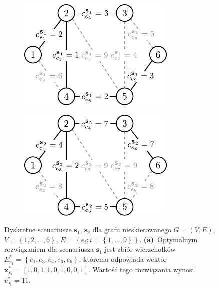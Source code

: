 \begin{figure}[!htbp]
	\null\hfill
	\begin{subfigure}[b]{0.35\textwidth}
		\includegraphics[width=\textwidth]{Chapter_II/MIN-MAX-REG-example/a}
		\caption{}
		\label{fig:minmaxregexample:a}
	\end{subfigure}
	\hfill
	\begin{subfigure}[b]{0.35\textwidth}
		\includegraphics[width=\textwidth]{Chapter_II/MIN-MAX-REG-example/b}
		\caption{}
		\label{fig:minmaxregexample:b}
	\end{subfigure}
	\hfill\null
	\caption{
		Dyskretne scenariusze $\textbf{s}_{1}$, $\textbf{s}_{2}$ dla grafu nieskierowanego $G = \left( V, E \right)$, $V = \left\{ 1, 2, \dots, 6 \right\}$, $E = \left\{ e_{i} : i = \left\{ 1, \dots, 9 \right\} \right\}$.
		\textbf{(a)}~Optymalnym rozwiązaniem dla scenariusza $\textbf{s}_{1}$ jest zbiór wierzchołków $E^{\ast}_{\textbf{s}_{1}} = \left\{ e_{1}, e_{3}, e_{4}, e_{6}, e_{9} \right\}$, któremu odpowiada wektor $\textbf{x}^{\ast}_{\textbf{s}_{1}} = \left[ 1, 0, 1, 1, 0, 1, 0, 0, 1 \right]$. Wartość tego rozwiązania wynosi $v^{\ast}_{\textbf{s}_{1}} = 11$.
}
\end{figure}
